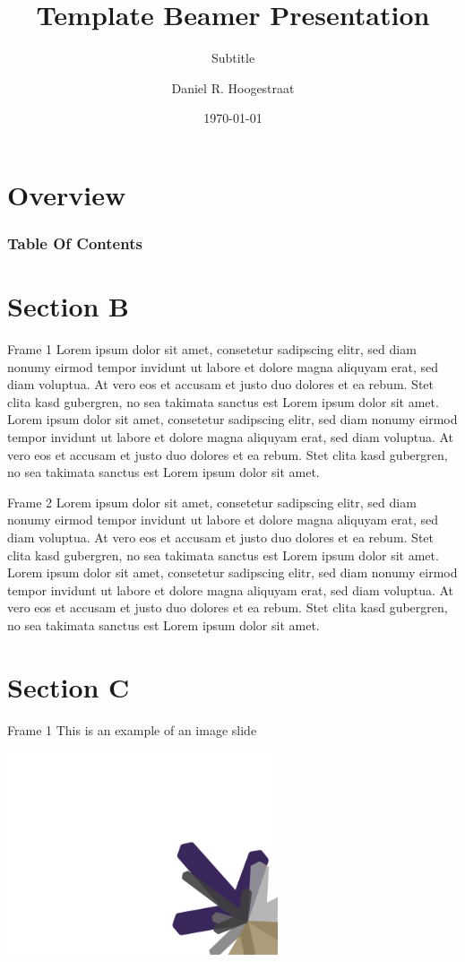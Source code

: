 \documentclass{beamer} %
\title{Template Beamer Presentation}
\subtitle{Subtitle}
\author{Daniel R. Hoogestraat}
\institute{Molecular Diagnosis Microbiology Division\\University of Washington {\Medium Seattle, WA}}
\date{\today}
\begin{document}
\maketitle

\section*{Overview}
\begin{frame}
	\frametitle{Table Of Contents}
	\tableofcontents[hideallsubsections]
\end{frame}

\section{Section B}

\begin{frame}{Frame 1}
	Lorem ipsum dolor sit amet, consetetur sadipscing elitr, sed diam nonumy eirmod tempor invidunt ut labore et dolore magna aliquyam erat, sed diam voluptua. At vero eos et accusam et justo duo dolores et ea rebum. Stet clita kasd gubergren, no sea takimata sanctus est Lorem ipsum dolor sit amet. Lorem  ipsum dolor sit amet, consetetur sadipscing elitr, sed diam nonumy eirmod tempor invidunt ut labore et dolore magna aliquyam erat, sed diam voluptua. At vero eos et accusam et justo duo dolores et ea rebum. Stet clita kasd gubergren, no sea takimata sanctus est Lorem ipsum dolor sit amet.
\end{frame}

\begin{frame}{Frame 2}
	Lorem ipsum dolor sit amet, consetetur sadipscing elitr, sed diam nonumy eirmod tempor invidunt ut labore et dolore magna aliquyam erat, sed diam voluptua. At vero eos et accusam et justo duo dolores et ea rebum. Stet clita kasd gubergren, no sea takimata sanctus est Lorem ipsum dolor sit amet. Lorem  ipsum dolor sit amet, consetetur sadipscing elitr, sed diam nonumy eirmod tempor invidunt ut labore et dolore magna aliquyam erat, sed diam voluptua. At vero eos et accusam et justo duo dolores et ea rebum. Stet clita kasd gubergren, no sea takimata sanctus est Lorem ipsum dolor sit amet.
\end{frame}

\section{Section C}
\begin{frame}{Frame 1}
This is an example of an image slide
\begin{table}[h]
  \centering
  \includegraphics[width=0.6\textwidth]{./img/background.pdf}
\end{table}

\end{frame}
\end{document}
